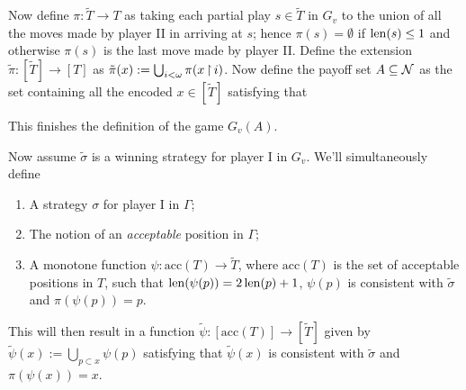 \qquad Now define $\pi:\tilde T\to T$ as taking each partial play $s\in\tilde T$ in $G_v$ to the union of all the moves made by player II in arriving at $s$; hence $\pi(s)=\emptyset$ if $\operatorname{len}(s)\leq 1$ and otherwise $\pi(s)$ is the last move made by player II. Define the extension $\tilde\pi:[\tilde T]\to [T]$ as $\tilde\pi(x):=\bigcup_{i<\omega}\pi(x\operatorname{\upharpoonright} i)$. Now define the payoff set $A\subseteq\operatorname{\mathcal{N}}$ as the set containing all the encoded $x\in[\tilde T]$ satisfying that

This finishes the definition of the game $G_v(A)$.

\prop{
\label{Gv is game prop}
$G_v(A)$ is equivalent to a perfect information game $G_{\omega}(\tilde A)$ for every $v\in (0,1]$.
}

Now assume $\tilde\sigma$ is a winning strategy for player I in $G_v$. We'll simultaneously define
\begin{enumerate}
\item A strategy $\sigma$ for player I in $\Gamma$;
\item The notion of an \textit{acceptable} position in $\Gamma$;
\item A monotone function $\psi:\text{acc}(T)\to\tilde T$, where $\text{acc}(T)$ is the set of acceptable positions in $T$, such that $\operatorname{len}(\psi(p))=2\operatorname{len}(p)+1$, $\psi(p)$ is consistent with $\tilde\sigma$ and $\pi(\psi(p))=p$.
\end{enumerate}

This will then result in a function $\tilde\psi:[\text{acc}(T)]\to[\tilde T]$ given by $\tilde\psi(x):=\bigcup_{p\subset x}\psi(p)$ satisfying that $\tilde\psi(x)$ is consistent with $\tilde\sigma$ and $\pi(\psi(x))=x$.\\


